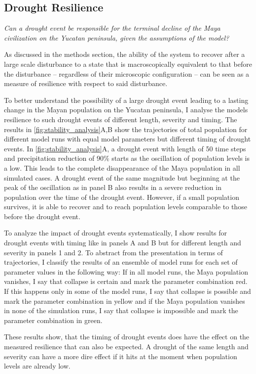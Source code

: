 \subsection{Drought Resilience}
\textit{Can a drought event be responsible for the terminal decline of the Maya civilization on the Yucatan peninsula, given the assumptions of the model?}

As discussed in the methods section, the ability of the system to recover after a large scale disturbance to a state that is macroscopically equivalent to that before the disturbance -- regardless of their microscopic configuration -- can be seen as a measure of resilience with respect to said disturbance.

To better understand the possibility of a large drought event leading to a lasting change in the Mayan population on the Yucatan peninsula, I analyse the models resilience to such drought events of different length, severity and timing. The results in \cref{fig:stability_analysis}A,B show the trajectories of total population for different model runs with equal model parameters but different timing of drought events. In \cref{fig:stability_analysis}A, a drought event with length of 50 time steps and precipitation reduction of 90\% starts as the oscillation of population levels is a low. This leads to the complete disappearance of the Maya population in all simulated cases. A drought event of the same magnitude but beginning at the peak of the oscillation as in panel B also results in a severe reduction in population over the time of the drought event. However, if a small population survives, it is able to recover and to reach population levels comparable to those before the drought event.

To analyze the impact of drought events systematically, I show results for drought events with timing like in panels A and B but for different length and severity in panels 1 and 2. To abstract from the presentation in terms of trajectories, I classify the results of an ensemble of model runs for each set of parameter values in the following way: If in all model runs, the Maya population vanishes, I say that collapse is certain and mark the parameter combination red. If this happens only in some of the model runs, I say that collapse is possible and mark the parameter combination in yellow and if the Maya population vanishes in none of the simulation runs, I say that collapse is impossible and mark the parameter combination in green.

These results show, that the timing of drought events does have the effect on the measured resilience that can also be expected. A drought of the same length and severity can have a more dire effect if it hits at the moment when population levels are already low.


